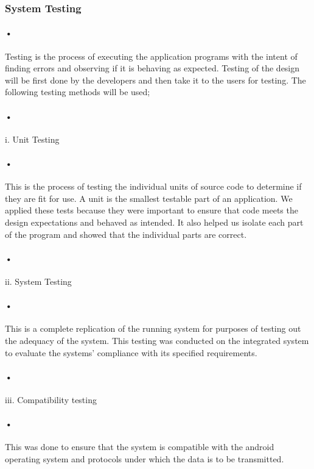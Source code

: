 \documentclass[12pt]{article}
\begin{document}
\subsubsection{System Testing} 
\paragraph{•}Testing is the process of executing the application programs with the intent of finding errors and observing if it is behaving as expected. Testing of the design will be first done by the developers and then take it to the users for testing. The following testing methods will be used;

\paragraph{•}i.	Unit Testing
\paragraph{•}This is the process of testing the individual units of source code to determine if they are fit for use. A unit is the smallest testable part of an application. We applied these tests because they were important to ensure that code meets the design expectations and behaved as intended. It also helped us isolate each part of the program and showed that the individual parts are correct.

\paragraph{•}ii.	System Testing
\paragraph{•}This is a complete replication of the running system for purposes of testing out the adequacy of the system. This testing was conducted on the integrated system to evaluate the systems’ compliance with its specified requirements.

\paragraph{•}iii.	Compatibility testing
\paragraph{•}This was done to ensure that the system is compatible with the android operating system and protocols under which the data is to be transmitted. 
\end{document}
